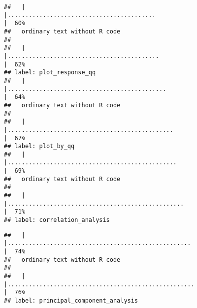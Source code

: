 \documentclass[
]{article}
\begin{document}
\begin{verbatim}
##   |                                                                              |..........................................                            |  60%
##   ordinary text without R code
## 
##   |                                                                              |...........................................                           |  62%
## label: plot_response_qq
##   |                                                                              |.............................................                         |  64%
##   ordinary text without R code
## 
##   |                                                                              |...............................................                       |  67%
## label: plot_by_qq
##   |                                                                              |................................................                      |  69%
##   ordinary text without R code
## 
##   |                                                                              |..................................................                    |  71%
## label: correlation_analysis
\end{verbatim}

\begin{verbatim}
##   |                                                                              |....................................................                  |  74%
##   ordinary text without R code
## 
##   |                                                                              |.....................................................                 |  76%
## label: principal_component_analysis
\end{verbatim}
\end{document}

